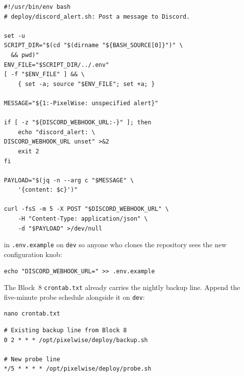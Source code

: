 \begin{verbatim}
#!/usr/bin/env bash
# deploy/discord_alert.sh: Post a message to Discord.

set -u
SCRIPT_DIR="$(cd "$(dirname "${BASH_SOURCE[0]}")" \
  && pwd)"
ENV_FILE="$SCRIPT_DIR/../.env"
[ -f "$ENV_FILE" ] && \
    { set -a; source "$ENV_FILE"; set +a; }

MESSAGE="${1:-PixelWise: unspecified alert}"

if [ -z "${DISCORD_WEBHOOK_URL:-}" ]; then
    echo "discord_alert: \
DISCORD_WEBHOOK_URL unset" >&2
    exit 2
fi

PAYLOAD="$(jq -n --arg c "$MESSAGE" \
    '{content: $c}')"

curl -fsS -m 5 -X POST "$DISCORD_WEBHOOK_URL" \
    -H "Content-Type: application/json" \
    -d "$PAYLOAD" >/dev/null
\end{verbatim}


\newthought{Document the new secret} in \texttt{.env.example} on
\texttt{dev} so anyone who clones the repository sees the new
configuration knob:

\begin{verbatim}
echo "DISCORD_WEBHOOK_URL=" >> .env.example
\end{verbatim}

The Block~8 \texttt{crontab.txt} already carries the nightly backup
line. Append the five-minute probe schedule alongside it on
\texttt{dev}:

\begin{verbatim}
nano crontab.txt
\end{verbatim}

\begin{verbatim}
# Existing backup line from Block 8
0 2 * * * /opt/pixelwise/deploy/backup.sh

# New probe line
*/5 * * * * /opt/pixelwise/deploy/probe.sh
\end{verbatim}


